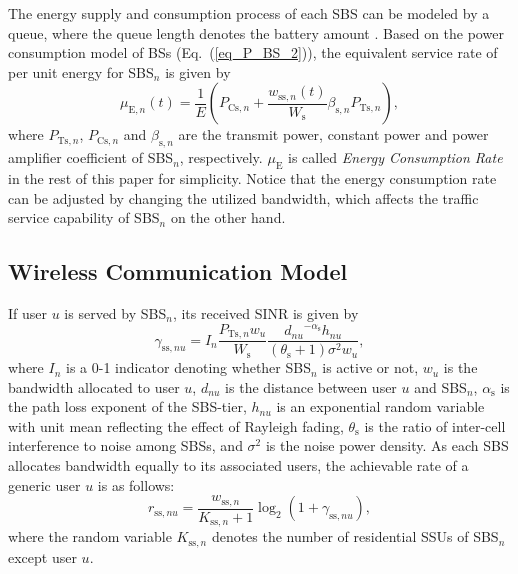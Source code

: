 \documentclass[12pt, draftclsnofoot,onecolumn]{IEEEtran}
\begin{document}
The energy supply and consumption process of each SBS can be modeled by a queue, where the queue length denotes the battery amount \cite{EH_single_link_2}.
Based on the power consumption model of BSs (Eq.~(\ref{eq_P_BS_2})),  the equivalent service rate of per unit energy for SBS$_n$ is given by
\begin{equation}\label{eq_mu}
    \mu_{\mathrm{E},n}(t) = \frac{1}{E} \left(P_{\mathrm{Cs},n} + \frac{w_{\mathrm{ss},n}(t)}{W_\mathrm{s}}\beta_{\mathrm{s},n} P_{\mathrm{Ts},n} \right),
\end{equation}
where $P_{\mathrm{Ts},n}$, $P_{\mathrm{Cs},n}$ and $\beta_{\mathrm{s},n}$ are the transmit power, constant power and power amplifier coefficient of SBS$_n$, respectively.
$\mu_{\mathrm{E}}$ is called \emph{Energy Consumption Rate} in the rest of this paper for simplicity.
Notice that the energy consumption rate can be adjusted by changing the utilized bandwidth, which affects the traffic service capability of SBS$_n$ on the other hand.

	\subsection{Wireless Communication Model}

        If user $u$ is served by SBS$_n$, its received SINR is given by \cite{Jeffery_fundamental}
            \begin{equation}\label{eq_SINR_SBS}
                \gamma_{\mathrm{ss},nu} = I_n \frac{P_{\mathrm{Ts},n} w_u}{W_\mathrm{s}} \frac{ {d_{nu}}^{-\alpha_\mathrm{s}} h_{nu} } { \left( \theta_\mathrm{s} +1 \right) \sigma^2 w_u },
            \end{equation}
        where $I_n$ is a 0-1 indicator denoting whether SBS$_n$ is active or not, $w_u$ is the bandwidth allocated to user $u$, $d_{nu}$ is the distance between user $u$ and SBS$_n$, $\alpha_\mathrm{s}$ is the path loss exponent of the SBS-tier, $h_{nu}$ is an exponential random variable with unit mean reflecting the effect of Rayleigh fading, $\theta_\mathrm{s}$ is the ratio of inter-cell interference to noise among SBSs, and $\sigma^2$ is the noise power density.
        As each SBS allocates bandwidth equally to its associated users, the achievable rate of a generic user $u$ is as follows:
            \begin{equation}\label{eq_r_s}
                r_{\mathrm{ss},nu} = \frac{w_{\mathrm{ss},n}}{K_{\mathrm{ss},n}+1} \log_2 (1 + \gamma_{\mathrm{ss},nu}),
            \end{equation}
        where the random variable $K_{\mathrm{ss},n}$ denotes the number of residential SSUs of SBS$_n$ except user $u$.
\end{document}
